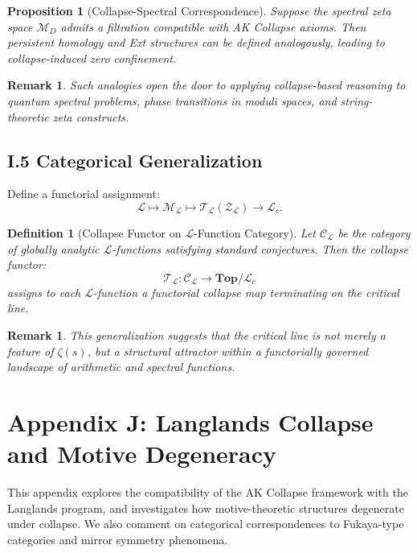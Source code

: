 \documentclass[11pt]{article}
\newtheorem{definition}[theorem]{Definition}
\newtheorem{proposition}[theorem]{Proposition}
\newtheorem{remark}[theorem]{Remark}
\begin{document}
\begin{proposition}[Collapse-Spectral Correspondence]
Suppose the spectral zeta space $\mathcal{M}_D$ admits a filtration compatible with AK Collapse axioms.  
Then persistent homology and Ext structures can be defined analogously, leading to collapse-induced zero confinement.
\end{proposition}

\begin{remark}
Such analogies open the door to applying collapse-based reasoning to quantum spectral problems,  
phase transitions in moduli spaces, and string-theoretic zeta constructs.
\end{remark}

\subsection*{I.5 Categorical Generalization}

Define a functorial assignment:
\[
\mathcal{L} \mapsto \mathcal{M}_{\mathcal{L}} \mapsto \mathcal{T}_{\mathcal{L}}(\mathcal{Z}_{\mathcal{L}}) \to \mathcal{L}_c.
\]

\begin{definition}[Collapse Functor on $\mathcal{L}$-Function Category]
Let $\mathcal{C}_\mathcal{L}$ be the category of globally analytic $\mathcal{L}$-functions satisfying standard conjectures.  
Then the collapse functor:
\[
\mathcal{T}_\mathcal{L} : \mathcal{C}_\mathcal{L} \to \textbf{Top}/\mathcal{L}_c
\]
assigns to each $\mathcal{L}$-function a functorial collapse map terminating on the critical line.
\end{definition}

\begin{remark}
This generalization suggests that the critical line is not merely a feature of $\zeta(s)$,  
but a structural attractor within a functorially governed landscape of arithmetic and spectral functions.
\end{remark}



\section*{Appendix J: Langlands Collapse and Motive Degeneracy}

This appendix explores the compatibility of the AK Collapse framework with the Langlands program,  
and investigates how motive-theoretic structures degenerate under collapse.  
We also comment on categorical correspondences to Fukaya-type categories and mirror symmetry phenomena.
\end{document}
